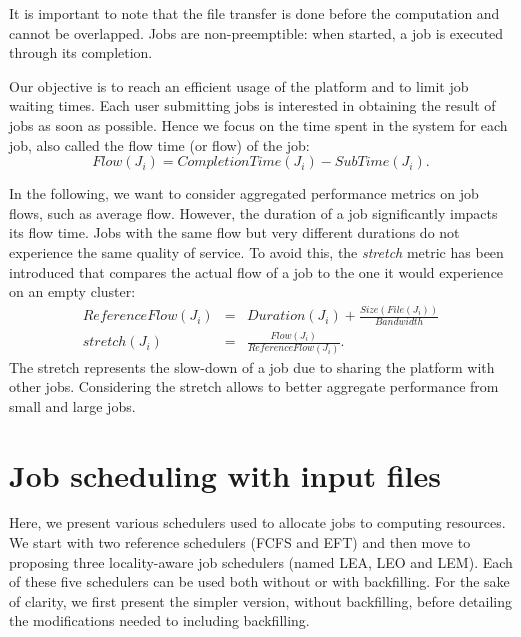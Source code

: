 \documentclass[conference,10pt]{IEEEtran}
\newcommand{\file}{\ensuremath{\mathit{File}}\xspace}
\newcommand{\size}{\ensuremath{\mathit{Size}}\xspace}
\newcommand{\duration}{\mathit{Duration}\xspace}
\newcommand{\bandwidth}{\mathit{Bandwidth}\xspace}
\newcommand{\submissiontime}{\mathit{SubTime}\xspace}
\newcommand{\emptyflow}{\mathit{ReferenceFlow}\xspace}
\newcommand{\completiontime}{\mathit{CompletionTime}\xspace}
\newcommand{\start}{\mathit{StartTime}\xspace}
\begin{document}
It is important to note that the file transfer is done before the computation and cannot be overlapped.
Jobs are non-preemptible: when started, a job is executed through its completion.

Our objective is to reach an efficient usage of the platform and to
limit job waiting times. Each
user submitting jobs is interested in obtaining the result of jobs
as soon as possible. Hence we focus on the time spent in the system
for each job, also called the flow time (or flow) of the job:
$$
\mathit{Flow}(J_i) = \completiontime(J_i) - \submissiontime(J_i).
$$

In the following, we want to consider aggregated performance metrics on
job flows, such as average flow. However, the duration
of a job significantly impacts its flow time. Jobs with the same
flow but very different durations do not experience the same quality
of service. To avoid this, the \emph{stretch} metric has been
introduced that compares the actual flow of a job to the one it would
experience on an empty cluster:
\begin{eqnarray*}
\emptyflow(J_i) &=& \duration(J_i) + \frac{\size(\file(J_i))}{\bandwidth}\\
\mathit{stretch}(J_i) &=& \frac{\mathit{Flow}(J_i)}{\emptyflow(J_i)}.
\end{eqnarray*}
The stretch represents the slow-down of a job due to sharing the
platform with other jobs. Considering the stretch
allows to better aggregate performance from small and large jobs.



\section{Job scheduling with input files}\label{sec.schedulers}


Here, we present various schedulers used to allocate jobs to
computing resources. We start with two reference schedulers (FCFS and EFT)
and then move to proposing three locality-aware job schedulers (named
LEA, LEO and LEM). Each of these five schedulers can be used both
without or with backfilling. For the sake of clarity, we first present
the simpler version, without backfilling, before detailing the modifications needed to including backfilling.
\end{document}
